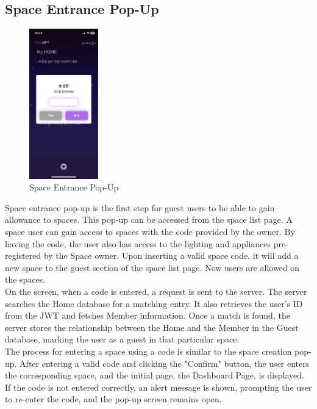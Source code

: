 \documentclass[conference]{IEEEtran}
\begin{document}
    \subsection{Space Entrance Pop-Up}
        \begin{figure}[htbp]
            \centerline{\includegraphics[width=3cm]{Images/screen/space/5_SPACE_POPUP2.PNG}}
            \caption{Space Entrance Pop-Up}
            \label{fig}
        \end{figure}
        Space entrance pop-up is the first step for guest users to be able to gain allowance to spaces. This pop-up can be accessed from the space list page.  A space user can gain access to spaces with the code provided by the owner. By having the code, the user also has access to the lighting and appliances pre-registered by the Space owner. Upon inserting a valid space code, it will add a new space to the guest section of the space list page. Now users are allowed on the spaces.\\
        On the screen, when a code is entered, a request is sent to the server. The server searches the Home database for a matching entry. It also retrieves the user's ID from the JWT and fetches Member information. Once a match is found, the server stores the relationship between the Home and the Member in the Guest database, marking the user as a guest in that particular space.\\
        The process for entering a space using a code is similar to the space creation pop-up. After entering a valid code and clicking the "Confirm" button, the user enters the corresponding space, and the initial page, the Dashboard Page, is displayed. If the code is not entered correctly, an alert message is shown, prompting the user to re-enter the code, and the pop-up screen remains open.
\end{document}
